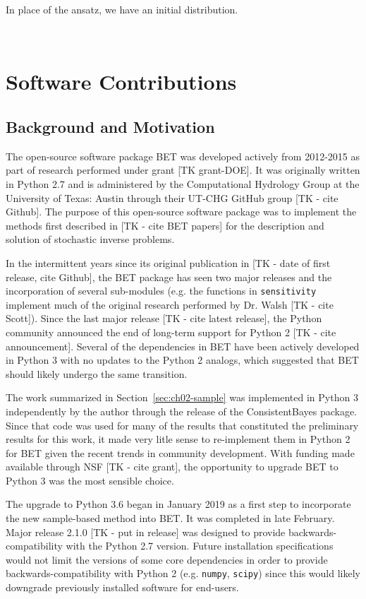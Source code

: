 In place of the ansatz, we have an initial distribution.


\
\section{Software Contributions}

\subsection{Background and Motivation}
The open-source software package BET was developed actively from 2012-2015 as part of research performed under grant [TK grant-DOE].
It was originally written in Python 2.7 and is administered by the Computational Hydrology Group at the University of Texas: Austin through their UT-CHG GitHub group [TK - cite Github]. 
The purpose of this open-source software package was to implement the methods first described in [TK - cite BET papers] for the description and solution of stochastic inverse problems. 

In the intermittent years since its original publication in [TK - date of first release, cite Github], the BET package has seen two major releases and the incorporation of several sub-modules (e.g. the functions in {\tt sensitivity} implement much of the original research performed by Dr. Walsh [TK - cite Scott]). 
Since the last major release [TK - cite latest release], the Python community announced the end of long-term support for Python 2 [TK - cite announcement]. 
Several of the dependencies in BET have been actively developed in Python 3 with no updates to the Python 2 analogs, which suggested that BET should likely undergo the same transition.

The work summarized in Section~\ref{sec:ch02-sample} was implemented in Python 3 independently by the author through the release of the ConsistentBayes package.
Since that code was used for many of the results that constituted the preliminary results for this work, it made very litle sense to re-implement them in Python 2 for BET given the recent trends in community development. 
With funding made available through NSF [TK - cite grant], the opportunity to upgrade BET to Python 3 was the most sensible choice. 

The upgrade to Python 3.6 began in January 2019 as a first step to incorporate the new sample-based method into BET. 
It was completed in late February. 
Major release 2.1.0 [TK - put in release] was designed to provide backwards-compatibility with the Python 2.7 version. 
Future installation specifications would not limit the versions of some core dependencies in order to provide backwards-compatibility with Python 2 (e.g. {\tt numpy}, {\tt scipy}) since this would likely downgrade previously installed software for end-users. 

